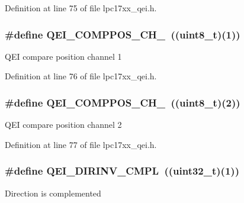 \-Definition at line 75 of file lpc17xx\-\_\-qei.\-h.

\hypertarget{group___q_e_i___public___macros_ga11e61fbcc2da19150d4243b70a45c567}{
\subsubsection[{\-Q\-E\-I\-\_\-\-C\-O\-M\-P\-P\-O\-S\-\_\-\-C\-H\-\_\-1}]{\setlength{\rightskip}{0pt plus 5cm}\#define {\bf \-Q\-E\-I\-\_\-\-C\-O\-M\-P\-P\-O\-S\-\_\-\-C\-H\-\_}~((uint8\-\_\-t)(1))}}\label{group___q_e_i___public___macros_ga11e61fbcc2da19150d4243b70a45c567}
\-Q\-E\-I compare position channel 1 

\-Definition at line 76 of file lpc17xx\-\_\-qei.\-h.

\hypertarget{group___q_e_i___public___macros_ga7361286e4cf215d251bd353cc78b3cf3}{
\subsubsection[{\-Q\-E\-I\-\_\-\-C\-O\-M\-P\-P\-O\-S\-\_\-\-C\-H\-\_\-2}]{\setlength{\rightskip}{0pt plus 5cm}\#define {\bf \-Q\-E\-I\-\_\-\-C\-O\-M\-P\-P\-O\-S\-\_\-\-C\-H\-\_}~((uint8\-\_\-t)(2))}}\label{group___q_e_i___public___macros_ga7361286e4cf215d251bd353cc78b3cf3}
\-Q\-E\-I compare position channel 2 

\-Definition at line 77 of file lpc17xx\-\_\-qei.\-h.

\hypertarget{group___q_e_i___public___macros_ga85f23a50dafe220e1cf061e457dd9601}{
\subsubsection[{\-Q\-E\-I\-\_\-\-D\-I\-R\-I\-N\-V\-\_\-\-C\-M\-P\-L}]{\setlength{\rightskip}{0pt plus 5cm}\#define {\bf \-Q\-E\-I\-\_\-\-D\-I\-R\-I\-N\-V\-\_\-\-C\-M\-P\-L}~((uint32\-\_\-t)(1))}}\label{group___q_e_i___public___macros_ga85f23a50dafe220e1cf061e457dd9601}
\-Direction is complemented 

